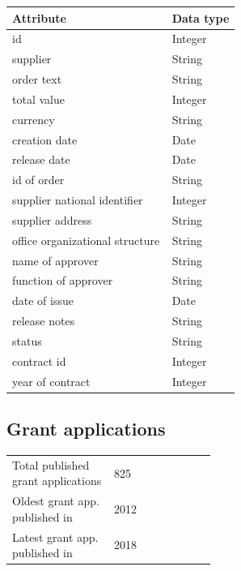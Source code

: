 \documentclass[thesis=B,english]{FITthesis}[2012/06/26]
\begin{document}
    \begin{center}
        \begin{tabular}{  p{0.7\linewidth} | p{0.3\linewidth} }
        Attribute & Data type\\ \hline
        id & Integer \\
        supplier & String \\
        order text & String \\
        total value & Integer \\
        currency & String \\
        creation date & Date \\
        release date & Date \\
        id of order & String \\
        supplier national identifier & Integer \\
        supplier address & String \\
        office organizational structure & String \\
        name of approver & String \\
        function of approver & String \\
        date of issue & Date \\
        release notes & String \\
        status & String \\
        contract id & Integer \\
        year of contract & Integer \\
        \end{tabular}
    \end{center}	
	\subsection{Grant applications}
	\begin{tabular}{  p{0.5\linewidth}  l }
        \\
        Total published grant applications & 825 \\
        Oldest grant app. published in & 2012\\
        Latest grant app. published in & 2018 \\
        \end{tabular}
        
\end{document}
